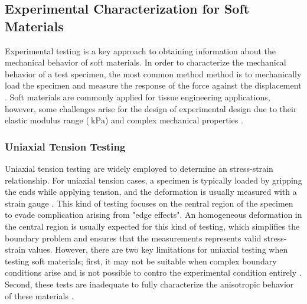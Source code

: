 \subsection{Experimental Characterization for Soft Materials}
\label{subsection:experimentalcharacterization}
Experimental testing is a key approach to obtaining information about the mechanical behavior of soft materials.
In order to characterize the mechanical behavior of a test specimen, the most common method
method is to mechanically load the specimen and measure the response of the force against 
the displacement \cite{Bergström2015}. Soft materials are commonly applied 
for tissue engineering applications, however, some challenges arise for the 
design of experimental design due to their elastic modulus range ($\SI{}{\kilo \pascal}$) and complex
mechanical properties \cite{Liu2009}.\\



\subsubsection*{Uniaxial Tension Testing}

Uniaxial tension testing are widely employed to determine an stress-strain relationship.
For uniaxial tension cases, a specimen is typically loaded by gripping the ends while applying 
tension, and the deformation is usually measured with a strain gauge \cite{Bergström2015}.
This kind of testing focuses on the central region of the specimen to evade complication arising from 
"edge effects". An homogeneous deformation in the central region is usually expected for this kind of testing, 
which simplifies the boundary problem and ensures that the measurements represents valid stress-strain values.
However, there are two key limitations for uniaxial testing when testing soft materials; first, 
it may not be suitable when complex boundary conditions arise and is not possible to contro the 
experimental condition entirely \cite{Seshaiyer2003}. Second, these tests are inadequate to 
fully characterize the anisotropic behavior of these materials \cite{Cox2006}.\\

